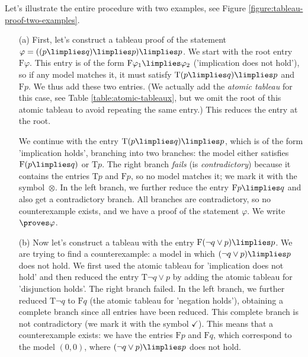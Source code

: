 \begin{example}\label{example:tableau-intro-examples}
Let's illustrate the entire procedure with two examples, see Figure \ref{figure:tableau-proof-two-examples}.
\begin{itemize}
    \item[(a)] First, let's construct a tableau proof of the statement $\varphi = ((p \limplies q) \limplies p) \limplies p$. We start with the root entry $\mathrm{F}\varphi$. This entry is of the form $\mathrm{F}\varphi_1 \limplies \varphi_2$ ('implication does not hold'), so if any model matches it, it must satisfy $\mathrm{T}(p \limplies q) \limplies p$ and $\mathrm{F}p$. We thus add these two entries. (We actually add the \emph{atomic tableau} for this case, see Table \ref{table:atomic-tableaux}, but we omit the root of this atomic tableau to avoid repeating the same entry.) This reduces the entry at the root.
    
    We continue with the entry $\mathrm{T}(p \limplies q) \limplies p$, which is of the form 'implication holds', branching into two branches: the model either satisfies $\mathrm{F}(p \limplies q)$ or $\mathrm{T}p$. The right branch \emph{fails} (is \emph{contradictory}) because it contains the entries $\mathrm{T}p$ and $\mathrm{F}p$, so no model matches it; we mark it with the symbol~$\otimes$. In the left branch, we further reduce the entry $\mathrm{F}p \limplies q$ and also get a contradictory branch. All branches are contradictory, so no counterexample exists, and we have a proof of the statement $\varphi$. We write $\proves \varphi$.
    
    \item[(b)] Now let's construct a tableau with the entry $\mathrm{F}(\neg q \lor p) \limplies p$. We are trying to find a counterexample: a model in which $(\neg q \lor p) \limplies p$ does not hold. We first used the atomic tableau for 'implication does not hold' and then reduced the entry $\mathrm{T}\neg q \lor p$ by adding the atomic tableau for 'disjunction holds'. The right branch failed. In the left branch, we further reduced $\mathrm{T}\neg q$ to $\mathrm{F}q$ (the atomic tableau for 'negation holds'), obtaining a complete branch since all entries have been reduced. This complete branch is not contradictory (we mark it with the symbol $\checkmark$). This means that a counterexample exists: we have the entries $\mathrm{F}p$ and $\mathrm{F}q$, which correspond to the model $(0,0)$, where $(\neg q \lor p) \limplies p$ does not hold.

\end{itemize}


\end{example}
